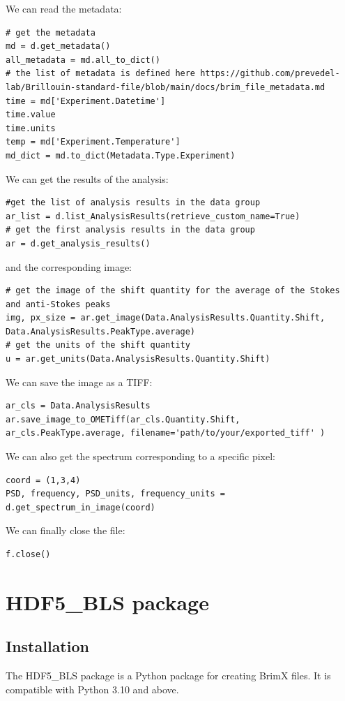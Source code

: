 \documentclass{article}
\begin{document}
We can read the metadata:
\begin{lstlisting}
# get the metadata 
md = d.get_metadata()
all_metadata = md.all_to_dict()
# the list of metadata is defined here https://github.com/prevedel-lab/Brillouin-standard-file/blob/main/docs/brim_file_metadata.md
time = md['Experiment.Datetime']
time.value
time.units
temp = md['Experiment.Temperature']
md_dict = md.to_dict(Metadata.Type.Experiment)
\end{lstlisting}

We can get the results of the analysis:
\begin{lstlisting}
#get the list of analysis results in the data group
ar_list = d.list_AnalysisResults(retrieve_custom_name=True)
# get the first analysis results in the data group
ar = d.get_analysis_results()
\end{lstlisting}
and the corresponding image: 
\begin{lstlisting}
# get the image of the shift quantity for the average of the Stokes and anti-Stokes peaks
img, px_size = ar.get_image(Data.AnalysisResults.Quantity.Shift, Data.AnalysisResults.PeakType.average)
# get the units of the shift quantity
u = ar.get_units(Data.AnalysisResults.Quantity.Shift)
\end{lstlisting}
We can save the image as a TIFF: 
\begin{lstlisting}
ar_cls = Data.AnalysisResults
ar.save_image_to_OMETiff(ar_cls.Quantity.Shift, ar_cls.PeakType.average, filename='path/to/your/exported_tiff' )
\end{lstlisting}
We can also get the spectrum corresponding to a specific pixel:
\begin{lstlisting}
coord = (1,3,4)
PSD, frequency, PSD_units, frequency_units = d.get_spectrum_in_image(coord)
\end{lstlisting}

We can finally close the file:
\begin{lstlisting}
f.close()
\end{lstlisting}

\section{HDF5\_BLS package}
\subsection{Installation}

The HDF5\_BLS package is a Python package for creating BrimX files. It is compatible with Python 3.10 and above. 
\end{document}
